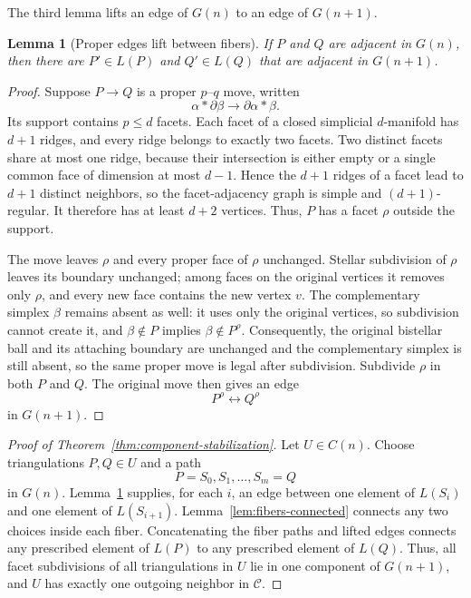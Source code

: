 \documentclass[11pt]{article}
\newtheorem{lemma}[theorem]{Lemma}
\theoremstyle{remark}
\theoremstyle{plain}
\begin{document}
The third lemma lifts an edge of \(G(n)\) to an edge of \(G(n+1)\).

\begin{lemma}[Proper edges lift between fibers]
\label{lem:edges-lift}
If \(P\) and \(Q\) are adjacent in \(G(n)\), then there are
\(P'\in L(P)\) and \(Q'\in L(Q)\) that are adjacent in \(G(n+1)\).
\end{lemma}

\begin{proof}
Suppose \(P\to Q\) is a proper \(p\)--\(q\) move, written
\[
 \alpha*\partial\beta\longrightarrow\partial\alpha*\beta.
\]
Its support contains \(p\le d\) facets.  Each facet of a closed simplicial
\(d\)-manifold has \(d+1\) ridges, and every ridge belongs to exactly two
facets.  Two distinct facets share at most one ridge, because their
intersection is either empty or a single common face of dimension at most
\(d-1\).  Hence the \(d+1\) ridges of a facet lead to \(d+1\) distinct
neighbors, so the facet-adjacency graph is simple and \((d+1)\)-regular.  It
therefore has at least \(d+2\) vertices.  Thus, \(P\) has a facet \(\rho\)
outside the support.

The move leaves \(\rho\) and every proper face of \(\rho\) unchanged.
Stellar subdivision of \(\rho\) leaves its boundary unchanged; among faces
on the original vertices it removes only \(\rho\), and every new face
contains the new vertex \(v\).  The complementary simplex \(\beta\) remains
absent as well: it uses only the original vertices, so subdivision cannot
create it, and \(\beta\notin P\) implies \(\beta\notin P^\rho\).
Consequently, the original bistellar ball and its attaching boundary are
unchanged and the complementary simplex is still absent, so the same proper
move is legal after subdivision.  Subdivide \(\rho\) in both \(P\) and
\(Q\).  The original move then gives an edge
\[
 P^\rho\longleftrightarrow Q^\rho
\]
in \(G(n+1)\).
\end{proof}

\begin{proof}[Proof of Theorem~\ref{thm:component-stabilization}]
Let \(U\in C(n)\).  Choose triangulations \(P,Q\in U\) and a path
\[
 P=S_0,S_1,\ldots,S_m=Q
\]
in \(G(n)\).  Lemma~\ref{lem:edges-lift} supplies, for each \(i\), an edge
between one element of \(L(S_i)\) and one element of \(L(S_{i+1})\).
Lemma~\ref{lem:fibers-connected} connects any two choices inside each fiber.
Concatenating the fiber paths and lifted edges connects any prescribed
element of \(L(P)\) to any prescribed element of \(L(Q)\).  Thus, all facet
subdivisions of all triangulations in \(U\) lie in one component of
\(G(n+1)\), and \(U\) has exactly one outgoing neighbor in \(\mathcal C\).
\end{proof}
\end{document}
